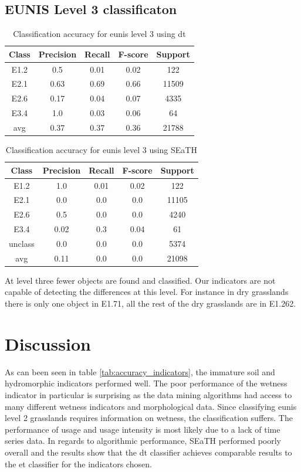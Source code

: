 \documentclass[authoryear,review,12pt,number]{elsarticle}
\begin{document}
\subsection{EUNIS Level 3 classificaton}
\begin{table}
\centering
\begin{tabular}{c c c c c}
Class & Precision & Recall & F-score & Support\\
\hline
E1.2 & 0.5 & 0.01 & 0.02 & 122\\
E2.1 & 0.63 & 0.69 & 0.66 & 11509\\
E2.6 & 0.17 & 0.04 & 0.07 & 4335\\
E3.4 & 1.0 & 0.03 & 0.06 & 64\\
avg & 0.37 & 0.37 & 0.36 & 21788\\
\end{tabular}
\caption{Classification accuracy for \gls{eunis} level 3 using \gls{dt}}
\end{table}
\begin{table}
\centering
\begin{tabular}{c c c c c}
Class & Precision & Recall & F-score & Support\\
\hline
E1.2 & 1.0 & 0.01 & 0.02 & 122\\
E2.1 & 0.0 & 0.0 & 0.0 & 11105\\
E2.6 & 0.5 & 0.0 & 0.0 & 4240\\
E3.4 & 0.02 & 0.3 & 0.04 & 61\\
unclass & 0.0 & 0.0 & 0.0 & 5374\\
avg & 0.11 & 0.0 & 0.0 & 21098\\
\end{tabular}
\caption{Classification accuracy for \gls{eunis} level 3 using SEaTH}
\end{table}
At level three fewer objects are found and classified. Our indicators are not 
capable of detecting the differences at this level. For instance in dry 
grasslands there is only one object in E1.71, all the rest of the dry 
grasslands are in E1.262.

\section{Discussion}
As can been seen in table \ref{tab:accuracy_indicators}, the immature soil and
hydromorphic indicators performed well. The poor performance of the wetness
indicator in particular is surprising as the data mining algorithms had 
access to many different wetness indicators and morphological data. Since 
classifying \gls{eunis} level 2 grasslands requires information on wetness, 
the classification suffers. The performance of usage and usage intensity is 
most likely due to a lack of time series data. In regards to algorithmic 
performance, SEaTH performed poorly overall and the results show that the 
\gls{dt} classifier achieves comparable results to the \gls{et} classifier 
for the indicators chosen. 
\end{document}
